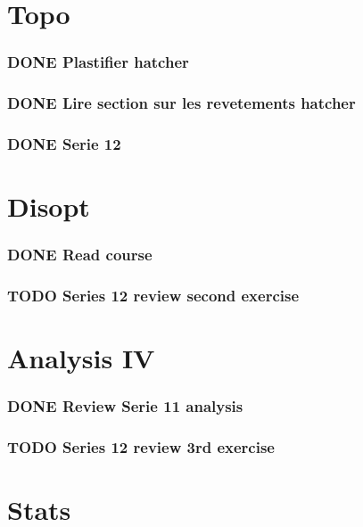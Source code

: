 \documentclass[11pt]{article}
\begin{document}
\section{Topo}
\label{sec:orga4aec00}
\subsubsection{{\bfseries\sffamily DONE} Plastifier hatcher}
\label{sec:org6282c60}
\subsubsection{{\bfseries\sffamily DONE} Lire section sur les revetements hatcher}
\label{sec:org4d0ea24}
\subsubsection{{\bfseries\sffamily DONE} Serie 12}
\label{sec:orgaf5fa2c}

\section{Disopt}
\label{sec:org4112261}
\subsubsection{{\bfseries\sffamily DONE} Read course}
\label{sec:org8da0ca3}
\subsubsection{{\bfseries\sffamily TODO} Series 12 review second exercise}
\label{sec:org7c92890}
\section{Analysis IV}
\label{sec:org231b2ae}
\subsubsection{{\bfseries\sffamily DONE} Review Serie 11 analysis}
\label{sec:org5a73acc}

\subsubsection{{\bfseries\sffamily TODO} Series 12 review 3rd exercise}
\label{sec:org698cf3d}

\section{Stats}
\label{sec:org538e32b}
\end{document}
